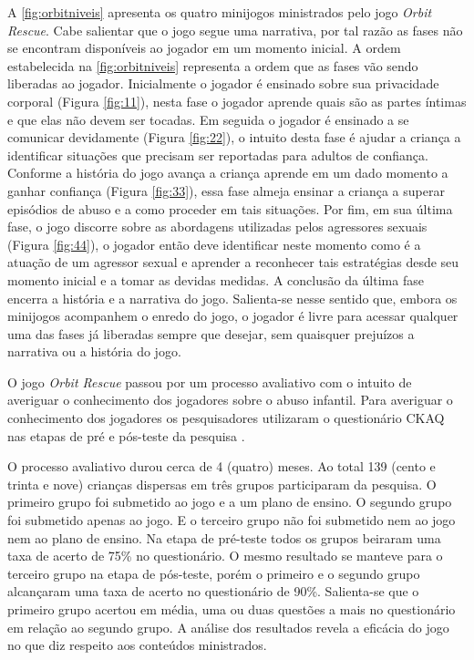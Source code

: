 A \autoref{fig:orbitniveis} apresenta os quatro minijogos ministrados pelo jogo \textit{Orbit Rescue}. Cabe salientar que o jogo segue uma narrativa, por tal razão as fases não se encontram disponíveis ao jogador em um momento inicial. A ordem estabelecida na \autoref{fig:orbitniveis} representa a ordem que as fases vão sendo liberadas ao jogador. Inicialmente o jogador é ensinado sobre sua privacidade corporal (Figura \ref{fig:11}), nesta fase o jogador aprende quais são as partes íntimas e que elas não devem ser tocadas. Em seguida o jogador é ensinado a se comunicar devidamente (Figura \ref{fig:22}), o intuito desta fase é ajudar a criança a identificar situações que precisam ser reportadas para adultos de confiança. Conforme a história do jogo avança a criança aprende em um dado momento a ganhar confiança (Figura \ref{fig:33}), essa fase almeja ensinar a criança a superar episódios de abuso e a como proceder em tais situações. Por fim, em sua última fase, o jogo discorre sobre as abordagens utilizadas pelos agressores sexuais  (Figura \ref{fig:44}), o jogador então deve identificar neste momento como é a atuação de um agressor sexual e aprender a reconhecer tais estratégias desde seu momento inicial e a tomar as devidas medidas. A conclusão da última fase encerra a história e a narrativa do jogo. Salienta-se nesse sentido que, embora os minijogos acompanhem o enredo do jogo, o jogador é livre para acessar qualquer uma das fases já liberadas sempre que desejar, sem quaisquer prejuízos a narrativa ou a história do jogo. 

O jogo \textit{Orbit Rescue} passou por um processo avaliativo com o intuito de averiguar o conhecimento dos jogadores sobre o abuso infantil. Para averiguar o conhecimento dos jogadores os pesquisadores utilizaram o questionário \ac{CKAQ} nas etapas de pré e pós-teste da pesquisa \cite{jones2020serious}.

O processo avaliativo durou cerca de 4 (quatro) meses. Ao total 139 (cento e trinta e nove) crianças dispersas em três grupos participaram da pesquisa. O primeiro grupo foi submetido ao jogo e a um plano de ensino. O segundo grupo foi submetido apenas ao jogo. E o terceiro grupo não foi submetido nem ao jogo nem ao plano de ensino. Na etapa de pré-teste todos os grupos beiraram uma taxa de acerto de 75\% no questionário. O mesmo resultado se manteve para o terceiro grupo na etapa de pós-teste, porém o primeiro e o segundo grupo alcançaram uma taxa de acerto no questionário de 90\%. Salienta-se que o primeiro grupo acertou em média, uma ou duas questões a mais no questionário em relação ao segundo grupo. A análise dos resultados revela a eficácia do jogo no que diz respeito aos conteúdos ministrados.

